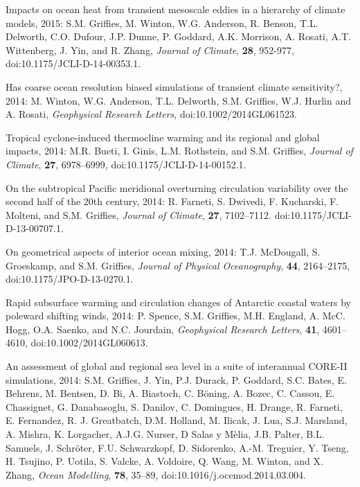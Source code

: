\begin{etaremune}
\item Impacts on ocean heat from transient mesoscale eddies in a hierarchy of climate models, 2015: S.M. Grif\/f\/ies, M. Winton, W.G. Anderson, R. Benson, T.L. Delworth, C.O. Dufour, J.P. Dunne, P. Goddard, A.K. Morrison, A. Rosati, A.T. Wittenberg, J. Yin, and R. Zhang, {\it Journal of Climate}, {\bf 28}, 952-977, doi:10.1175/JCLI-D-14-00353.1.

\item Has coarse ocean resolution biased simulations of transient climate sensitivity?, 2014: M.  Winton, W.G. Anderson, T.L. Delworth, S.M. Grif\/f\/ies, W.J. Hurlin and A. Rosati, {\it Geophysical Research Letters}, doi:10.1002/2014GL061523.

\item Tropical cyclone-induced thermocline warming and its regional and global impacts, 2014: M.R. Bueti, I. Ginis, L.M. Rothstein, and S.M. Grif\/f\/ies, {\it Journal of Climate}, {\bf 27},
  6978--6999, doi:10.1175/JCLI-D-14-00152.1.

\item On the subtropical Pacific meridional overturning circulation variability over the second half of the 20th century, 2014:  R. Farneti, S. Dwivedi, F. Kucharski, F. Molteni, and S.M. Grif\/f\/ies, {\it Journal of Climate}, {\bf 27}, 7102--7112.  doi:10.1175/JCLI-D-13-00707.1.

\item On geometrical aspects of interior ocean mixing, 2014:  T.J. McDougall, S. Groeskamp, and S.M. Grif\/f\/ies, {\it Journal of Physical Oceanography}, {\bf 44}, 2164--2175, doi:10.1175/JPO-D-13-0270.1.

\item Rapid subsurface warming and circulation changes of Antarctic coastal waters by poleward shifting winds, 2014: P. Spence, S.M. Grif\/f\/ies, M.H. England, A. McC. Hogg, O.A. Saenko, and N.C. Jourdain, {\it Geophysical Research Letters}, {\bf 41}, 4601--4610, doi:10.1002/2014GL060613.

\item An assessment of global and regional sea level in a suite of interannual CORE-II simulations, 2014: S.M. Grif\/f\/ies, J. Yin, P.J. Durack, P. Goddard, S.C. Bates, E. Behrens, M. Bentsen,  D. Bi, A. Biastoch, C. B\"oning, A. Bozec, C. Cassou, E. Chassignet,
  G. Danabasoglu, S. Danilov, C. Domingues, H. Drange, R. Farneti,  E. Fernandez, R. J. Greatbatch, D.M. Holland, M. Ilicak, J. Lua,
  S.J. Marsland, A. Mishra, K. Lorgacher, A.J.G. Nurser, D Salas y  M\`elia, J.B.  Palter, B.L. Samuels, J. Schr\"oter, F.U. Schwarzkopf, D. Sidorenko, A.-M. Treguier, Y. Tseng,  H. Tsujino, P. Uotila, S. Valcke, A. Voldoire, Q. Wang, M. Winton,  and X. Zhang, {\it Ocean Modelling}, {\bf 78}, 35--89,
  doi:10.1016/j.ocemod.2014.03.004.


\end{etaremune}
